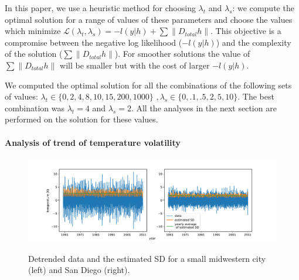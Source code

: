\documentclass{article}
\begin{document}
In this paper, we use a heuristic method for choosing $\lambda_t$ and
$\lambda_s$: we compute the optimal solution for a range of values of
these parameters and choose the values which minimize
$\mathscr{L}(\lambda_t,\lambda_s)=-l(y|h)+ \sum \lVert D_{total}h
\lVert$. This objective is a compromise between the negative log
likelihood ($-l(y|h)$) and the complexity of the solution ($\sum
\lVert D_{total}h \lVert$). For smoother solutions the value of $\sum
\lVert D_{total}h \lVert$ will be smaller but with the cost of larger
$-l(y|h)$. 

We computed the optimal solution for all the combinations of the
following sets of values: $\lambda_t \in \{0,2,4,8,10,15,200,1000\} \, \, ,
\lambda_s \in \{0,.1,.5,2,5,10\}$. The best combination was
$\lambda_t=4$ and $\lambda_s=2$. All the analyses in the next section
are performed on the solution for these values.  


\paragraph{Analysis of trend of temperature volatility}

\begin{figure}[tb]
  \centering
  \includegraphics[width=.9 \columnwidth]{Figures/ts_estimatedVar}\\
  \caption{Detrended data and the estimated SD for
    a small midwestern city (left) and San Diego (right).} 
  \label{fig:avg_change_estimatedSD}
\end{figure} 
\end{document}
